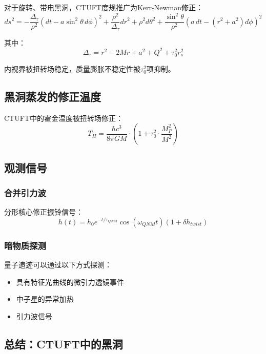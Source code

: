 对于旋转、带电黑洞，CTUFT度规推广为Kerr-Newman修正：
\begin{equation}
    ds^2 = -\frac{\Delta_\tau}{\rho^2}\left(dt - a\sin^2\theta \, d\phi\right)^2 + \frac{\rho^2}{\Delta_\tau}dr^2 + \rho^2 d\theta^2 + \frac{\sin^2\theta}{\rho^2}\left(a \, dt - (r^2+a^2)d\phi\right)^2
\end{equation}

其中：
\begin{equation}
    \Delta_\tau = r^2 - 2Mr + a^2 + Q^2 + \tau_0^2 r_s^2
\end{equation}

内视界被扭转场稳定，质量膨胀不稳定性被$\tau_0^2$项抑制。

\subsection{黑洞蒸发的修正温度}

CTUFT中的霍金温度被扭转场修正：
\begin{equation}
    T_H = \frac{\hbar c^3}{8\pi G M} \cdot \left(1 + \tau_0^2 \cdot \frac{M_P^2}{M^2}\right)
\end{equation}

\subsection{观测信号}

\subsubsection{合并引力波}

分形核心修正振铃信号：
\begin{equation}
    h(t) = h_0 e^{-t/\tau_{QNM}} \cos(\omega_{QNM}t)(1 + \delta h_{twist})
\end{equation}

\subsubsection{暗物质探测}

量子遗迹可以通过以下方式探测：
\begin{itemize}
    \item 具有特征光曲线的微引力透镜事件
    \item 中子星的异常加热
    \item 引力波信号
\end{itemize}

\subsection{总结：CTUFT中的黑洞}

